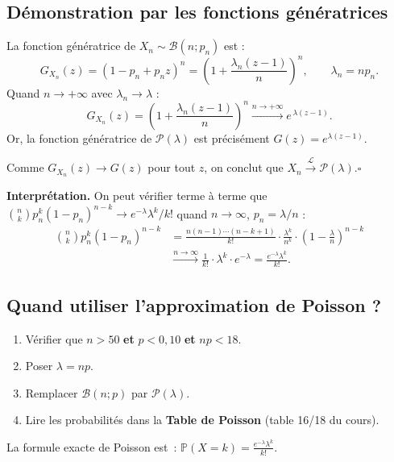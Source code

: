 \documentclass[11pt,a4paper]{article}
\renewcommand{\P}{\mathbb{P}}
\begin{document}
\subsection{D\'emonstration par les fonctions g\'en\'eratrices}

\begin{demobox}
La fonction g\'en\'eratrice de $X_n \sim \mathcal{B}(n;p_n)$ est :
$$G_{X_n}(z) = \left(1 - p_n + p_n z\right)^n = \left(1 + \frac{\lambda_n(z-1)}{n}\right)^n, \qquad \lambda_n = np_n.$$
Quand $n\to+\infty$ avec $\lambda_n \to \lambda$ :
$$G_{X_n}(z) = \left(1 + \frac{\lambda_n(z-1)}{n}\right)^n \xrightarrow{n\to+\infty} e^{\,\lambda(z-1)}.$$
Or, la fonction g\'en\'eratrice de $\mathcal{P}(\lambda)$ est pr\'ecis\'ement $G(z) = e^{\lambda(z-1)}$.

Comme $G_{X_n}(z) \to G(z)$ pour tout $z$, on conclut que $X_n \xrightarrow{\mathcal{L}} \mathcal{P}(\lambda)$.\hfill$\square$
\end{demobox}

\textbf{Interpr\'etation.} On peut v\'erifier terme \`a terme que $\binom{n}{k}p_n^k(1-p_n)^{n-k} \to e^{-\lambda}\lambda^k/k!$ quand $n\to\infty$, $p_n=\lambda/n$ :
\begin{align*}
\binom{n}{k}p_n^k(1-p_n)^{n-k}
&= \frac{n(n-1)\cdots(n-k+1)}{k!} \cdot \frac{\lambda^k}{n^k}\cdot\left(1-\frac{\lambda}{n}\right)^{n-k}\\[4pt]
&\xrightarrow{n\to\infty} \frac{1}{k!}\cdot \lambda^k \cdot e^{-\lambda}
= \frac{e^{-\lambda}\lambda^k}{k!}.
\end{align*}

\subsection{Quand utiliser l'approximation de Poisson ?}

\begin{methbox}
\begin{enumerate}
  \item V\'erifier que $n > 50$ \textbf{et} $p < 0{,}10$ \textbf{et} $np < 18$.
  \item Poser $\lambda = np$.
  \item Remplacer $\mathcal{B}(n;p)$ par $\mathcal{P}(\lambda)$.
  \item Lire les probabilit\'es dans la \textbf{Table de Poisson} (table 16/18 du cours).
\end{enumerate}
La formule exacte de Poisson est~: $\displaystyle\P(X=k) = \frac{e^{-\lambda}\lambda^k}{k!}$.
\end{methbox}
\end{document}
